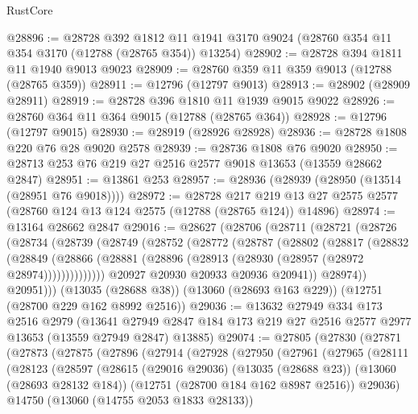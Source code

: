 \begin{lexlean}{RustCore}
\begin{coremodule}
@28896 := @28728
    @392
    @1812
    @11
    @1941
    @3170
    @9024
    (@28760 @354 @11 @354 @3170 (@12788 (@28765 @354)) @13254)
@28902 := @28728 @394 @1811 @11 @1940 @9013 @9023
@28909 := @28760 @359 @11 @359 @9013 (@12788 (@28765 @359))
@28911 := @12796 (@12797 @9013)
@28913 := @28902 (@28909 @28911)
@28919 := @28728 @396 @1810 @11 @1939 @9015 @9022
@28926 := @28760 @364 @11 @364 @9015 (@12788 (@28765 @364))
@28928 := @12796 (@12797 @9015)
@28930 := @28919 (@28926 @28928)
@28936 := @28728 @1808 @220 @76 @28 @9020 @2578
@28939 := @28736 @1808 @76 @9020
@28950 := @28713 @253 @76 @219 @27 @2516 @2577 @9018 @13653 (@13559 @28662 @2847)
@28951 := @13861 @253
@28957 := @28936 (@28939 (@28950 (@13514 (@28951 @76 @9018))))
@28972 := @28728
    @217
    @219
    @13
    @27
    @2575
    @2577
    (@28760 @124 @13 @124 @2575 (@12788 (@28765 @124)) @14896)
@28974 := @13164 @28662 @2847
@29016 := @28627
    (@28706
      (@28711
        (@28721
          (@28726
            (@28734
              (@28739
                (@28749
                  (@28752
                    (@28772
                      (@28787
                        (@28802
                          (@28817
                            (@28832
                              (@28849
                                (@28866
                                  (@28881
                                    (@28896 (@28913 (@28930 (@28957 (@28972 @28974))))))))))))))
                  @20927
                  @20930
                  @20933
                  @20936
                  @20941))
              @28974))
          @20951)))
    (@13035 (@28688 @38))
    (@13060 (@28693 @163 @229))
    (@12751 (@28700 @229 @162 @8992 @2516))
@29036 := @13632
    @27949
    @334
    @173
    @2516
    @2979
    (@13641 @27949 @2847 @184 @173 @219 @27 @2516 @2577 @2977 @13653 (@13559 @27949 @2847) @13885)
@29074 := @27805
    (@27830
      (@27871
        (@27873
          (@27875
            (@27896
              (@27914
                (@27928
                  (@27950
                    (@27961
                      (@27965
                        (@28111
                          (@28123
                            (@28597
                              (@28615
                                (@29016 @29036)
                                (@13035 (@28688 @23))
                                (@13060 (@28693 @28132 @184))
                                (@12751 (@28700 @184 @162 @8987 @2516))
                                @29036)
                              @14750
                              (@13060 (@14755 @2053 @1833 @28133))

\end{coremodule}
\end{lexlean}
